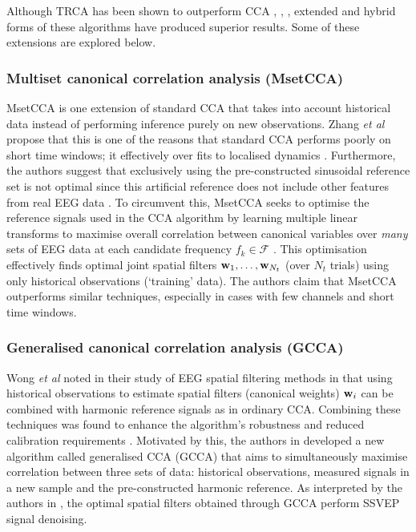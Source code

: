 Although TRCA has been shown to outperform CCA \cite{lee-trca-2step}, \cite{miao-hybrid-cca}, \cite{sun-gcca}, extended and hybrid forms of these algorithms have produced superior results. Some of these extensions are explored below.

\subsubsection{Multiset canonical correlation analysis (MsetCCA)}
\label{subsection:mset-cca-c2}
MsetCCA is one extension of standard CCA that takes into account historical data instead of performing inference purely on new observations. Zhang \textit{et al} propose that this is one of the reasons that standard CCA performs poorly on short time windows; it effectively over fits to localised dynamics \cite{zhang-mset-cca}. Furthermore, the authors suggest that exclusively using the pre-constructed sinusoidal reference set is not optimal since this artificial reference does not include other features from real EEG data \cite{zhang-mset-cca}. To circumvent this, MsetCCA seeks to optimise the reference signals used in the CCA algorithm by learning multiple linear transforms to maximise overall correlation between canonical variables over \textit{many} sets of EEG data at each candidate frequency $f_k \in \mathcal{F}$ \cite{zhang-mset-cca}. This optimisation effectively finds optimal joint spatial filters ${\mathbf{w}}_1, \dots, {\mathbf{w}}_{N_t}$ (over $N_t$ trials) using only historical observations (`training' data). The authors claim that MsetCCA outperforms similar techniques, especially in cases with few channels and short time windows. 

\subsubsection{Generalised canonical correlation analysis (GCCA)}
\label{subsection:gcca-c2}
Wong \textit{et al} noted in their study of EEG spatial filtering methods in \cite{wong-spatial-filt} that using historical observations to estimate spatial filters (canonical weights) ${\mathbf{w}}_i$ can be combined with harmonic reference signals as in ordinary CCA. Combining these techniques was found to enhance the algorithm's robustness and reduced calibration requirements \cite{wong-spatial-filt}.  Motivated by this, the authors in \cite{sun-gcca} developed a new algorithm called generalised CCA (GCCA) that aims to simultaneously maximise correlation between three sets of data: historical observations, measured signals in a new sample and the pre-constructed harmonic reference. As interpreted by the authors in \cite{sun-gcca}, the optimal spatial filters obtained through GCCA perform SSVEP signal denoising.

